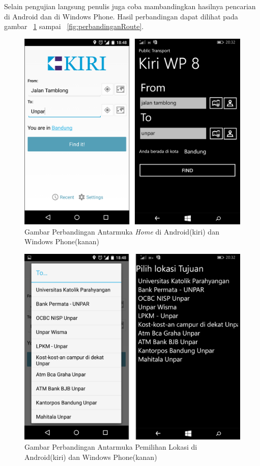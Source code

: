 Selain pengujian langsung penulis juga coba mambandingkan hasilnya pencarian di Android dan di Windows Phone. Hasil perbandingan dapat dilihat pada gambar ~\ref{fig:perbandinganHome} sampai ~\ref{fig:perbandinganRoute}.
	\begin{figure}[!h]
		\centering
			\includegraphics[scale=0.15]{Gambar/perbandingan/perbandingan_home}
		\caption{Gambar Perbandingan Antarmuka \textit{Home} di Android(kiri) dan Windows Phone(kanan)}
		\label{fig:perbandinganHome}
	\end{figure}

	\begin{figure}[!h]
		\centering
			\includegraphics[scale=0.15]{Gambar/perbandingan/perbandingan_pilih}
		\caption{Gambar Perbandingan Antarmuka Pemilihan Lokasi di Android(kiri) dan Windows Phone(kanan)}
		\label{fig:perbandinganPilih}
	\end{figure}
	
